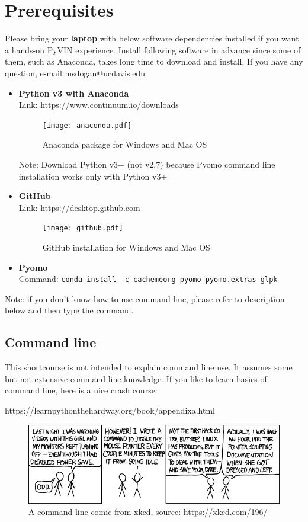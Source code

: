 \documentclass[12pt]{article}%
\begin{document}
\section{Prerequisites}
Please bring your \textbf{laptop} with below software dependencies installed if you want a hands-on PyVIN experience. Install following software in advance since some of them, such as Anaconda, takes long time to download and install. If you have any question, e-mail msdogan@ucdavis.edu
%
\begin{itemize}
	\item {\bf Python v3 with Anaconda} \\ Link: https://www.continuum.io/downloads
	\begin{figure}[H]
		\centering
    		\texttt{[image: anaconda.pdf]}
   		\caption{Anaconda package for Windows and Mac OS}
    		\label{fig:anaconda}
	\end{figure}
	Note: Download Python v3+ (not v2.7) because Pyomo command line installation works only with Python v3+
	\item {\bf GitHub} \\ Link: https://desktop.github.com
	\begin{figure}[H]
		\centering
    		\texttt{[image: github.pdf]}
   		\caption{GitHub installation for Windows and Mac OS}
    		\label{fig:github}
	\end{figure}
	\item {\bf Pyomo} \\ Command: {\tt \small conda install -c cachemeorg pyomo pyomo.extras glpk}
\end{itemize}
%
Note: if you don't know how to use command line, please refer to description below and then type the command.
\subsection{Command line}
%
This shortcourse is not intended to explain command line use. It assumes some but not extensive command line knowledge. If you like to learn basics of command line, here is a nice crash course:
%
\par https://learnpythonthehardway.org/book/appendixa.html
%
\begin{figure}[H]
    \centering
    \includegraphics[width=1\linewidth]{command_line_fu.png}
    \caption{A command line comic from xkcd, source: https://xkcd.com/196/}
    \label{fig:command_line}
\end{figure}
%
\end{document}
